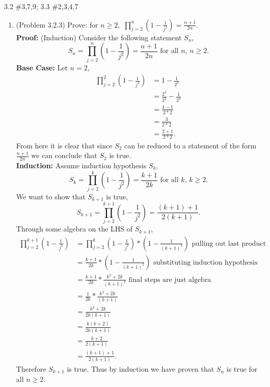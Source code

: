\documentclass{amsart}
\begin{document}
\thispagestyle{fancy}

3.2 \#3,7,9;  3.3 \#2,3,4,7

\begin{enumerate}
\item (Problem 3.2.3) Prove: for $n\geq 2,$ $\displaystyle{\prod_{j=2}^n\left(1-\frac{1}{j^2} \right)=\frac{n+1}{2n}}.$\\

\textbf{Proof:} (Induction) Consider the following statement $S_n$,
\begin{equation*}
S_n = \displaystyle{\prod_{j=2}^n\left(1-\frac{1}{j^2} \right)=\frac{n+1}{2n}} \text{  for all $n$, $n\geq 2$}.
\end{equation*}
\textbf{Base Case:} Let $n=2$, 
\begin{align*}
 \prod_{j=2}^2\left(1-\frac{1}{j^2} \right) &= 1- \frac{1}{2^2}\\
 &=\frac{2^2}{2^2}-\frac{1}{2^2}\\
 &=\frac{4-1}{2*2}\\
 &=\frac{3}{2*2}\\
 &=\frac{2+1}{2*2}.
 \end{align*}
From here it is clear that since $S_2$ can be reduced to a statement of the form $\frac{n+1}{2n}$ we can conclude that $S_2$ is true.\\

\textbf{Induction:} Assume induction hypothesis $S_k$,
\begin{equation*}
S_k = \displaystyle{\prod_{j=2}^k\left(1-\frac{1}{j^2} \right)=\frac{k+1}{2k}} \text{  for all $k$, $k \geq 2$}.
\end{equation*}
We want to show that $S_{k+1}$ is true, 
 \begin{equation*}
S_{k+1} = \displaystyle{\prod_{j=2}^{k+1}\left(1-\frac{1}{j^2} \right)=\frac{(k+1)+1}{2(k+1)}}.
\end{equation*}
Through some algebra on the LHS of $S_{k+1}$,
\begin{align*}
\prod_{j=2}^{k+1}\left(1-\frac{1}{j^2} \right) &= \prod_{j=2}^{k}\left(1-\frac{1}{j^2} \right)*(1-\frac{1}{(k+1)^2}) \text{   pulling out last product}\\
 &=\frac{k+1}{2k}*(1-\frac{1}{(k+1)^2}) \text{ substituting induction hypothesis}\\
 &=\frac{k+1}{2k}*\frac{k^2+2k}{(k+1)^2} \text {   final steps are just algebra}\\
  &=\frac{1}{2k}*\frac{k^2+2k}{(k+1)}\\
   &=\frac{k^2+2k}{2k(k+1)}\\
    &=\frac{k(k+2)}{2k(k+1)}\\
     &=\frac{k+2}{2(k+1)}\\
      &=\frac{(k+1)+1}{2(k+1)}.
\end{align*}
Therefore $S_{k+1}$ is true. Thus by induction we have proven that $S_n$ is true for all $n \geq 2$.\\\\






\end{enumerate}
\end{document}
